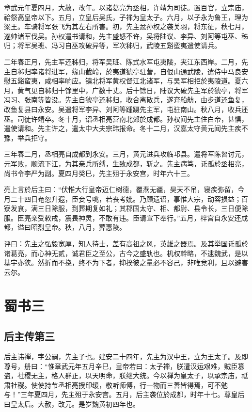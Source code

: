 \documentclass[12pt,UTF8]{ctexbook}
\begin{document}
章武元年夏四月，大赦，改年。以诸葛亮为丞相，许靖为司徒。置百官，立宗庙，祫祭高皇帝以下。五月，立皇后吴氏，子禅为皇太子。六月，以子永为鲁王，理为梁王。车骑将军张飞为其左右所害。初，先主忿孙权之袭关羽，将东征，秋七月，遂帅诸军伐吴。孙权遣书请和，先主盛怒不许，吴将陆议、李异、刘阿等屯巫、秭归；将军吴班、冯习自巫攻破异等，军次秭归，武陵五谿蛮夷遣使请兵。

二年春正月，先主军还秭归，将军吴班、陈式水军屯夷陵，夹江东西岸。二月，先主自秭归率诸将进军，缘山截岭，於夷道猇亭驻营，自佷山通武陵，遣侍中马良安慰五谿蛮夷，咸相率响应。镇北将军黄权督江北诸军，与吴军相拒於夷陵道。夏六月，黄气见自秭归十馀里中，广数十丈。后十馀日，陆议大破先主军於猇亭，将军冯习、张南等皆没。先主自猇亭还秭归，收合离散兵，遂弃船舫，由步道还鱼复，改鱼复县曰永安。吴遣将军李异、刘阿等踵蹑先主军，屯驻南山。秋八月，收兵还巫。司徒许靖卒。冬十月，诏丞相亮营南北郊於成都。孙权闻先主住白帝，甚惧，遣使请和。先主许之，遣太中大夫宗玮报命。冬十二月，汉嘉太守黄元闻先主疾不豫，举兵拒守。

三年春二月，丞相亮自成都到永安。三月，黄元进兵攻临邛县。遣将军陈曶讨元，元军败，顺流下江，为其亲兵所缚，生致成都，斩之。先主病笃，讬孤於丞相亮，尚书令李严为副。夏四月癸巳，先主殂于永安宫，时年六十三。

亮上言於后主曰：“伏惟大行皇帝迈仁树德，覆焘无疆，昊天不吊，寝疾弥留，今月二十四日奄忽升遐，臣妾号咷，若丧考妣。乃顾遗诏，事惟大宗，动容损益；百寮发哀，满三日除服，到葬期复如礼；其郡国太守、相、都尉、县令长，三日便除服。臣亮亲受敕戒，震畏神灵，不敢有违。臣请宣下奉行。”五月，梓宫自永安还成都，谥曰昭烈皇帝。秋，八月，葬惠陵。

评曰：先主之弘毅宽厚，知人待士，盖有高祖之风，英雄之器焉。及其举国讬孤於诸葛亮，而心神无贰，诚君臣之至公，古今之盛轨也。机权幹略，不逮魏武，是以基宇亦狭。然折而不挠，终不为下者，抑揆彼之量必不容己，非唯竞利，且以避害云尔。

\part{蜀书三}
\chapter{后主传第三}

后主讳禅，字公嗣，先主子也。建安二十四年，先主为汉中王，立为王太子。及即尊号，册曰：“惟章武元年五月辛巳，皇帝若曰：太子禅，朕遭汉运艰难，贼臣篡盗，社稷无主，格人群正，以天明命，朕继大统。今以禅为皇太子，以承宗庙，祗肃社稷。使使持节丞相亮授印缓，敬听师傅，行一物而三善皆得焉，可不勉与！”三年夏四月，先主殂于永安宫。五月，后主袭位於成都，时年十七。尊皇后曰皇太后。大赦，改元。是岁魏黄初四年也。
\end{document}
